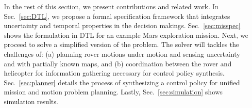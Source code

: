\documentclass[letterpaper]{article} %
\begin{document}
	In the rest of this section, we present contributions and related work.
	In Sec.~\ref{sec:DTL}, we propose a formal specification framework that integrates uncertainty and temporal
	properties in the decision makings.
	Sec.~\ref{sec:misspec} shows the formulation in DTL for an example Mars exploration mission.
	Next, we proceed to solve a simplified version of the problem. The solver will tackles the challenges of:
	(a) planning rover motions under motion and sensing uncertainty and with partially known maps,
	and (b) coordination between the rover and helicopter for information gathering necessary
	for control policy synthesis.
	Sec.~\ref{sec:planner} details the process of synthesizing a control policy for unified mission
	and motion problem planning.
	Lastly, Sec.~\ref{sec:simulation} shows simulation results.
	
\end{document}
